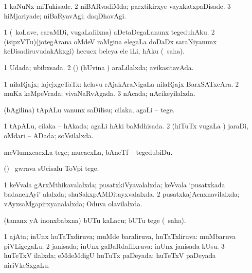 \bentry
{} 
\gl{\kirxvi}
\expl{}
\bmng
\bnum
\num{1} kaNuNx miTukisade. 
\num{2} niBARvadiMda; parxtikirxye vayxkatxpaDisade. 
\num{3} hiMjariyade; niBaRyavAgi; daqDhavAgi. 
\enum
\emng
\eentry

\bentry
{} 
\gl{\sakirx}
\expl{}
\bmng
\bnum
\num{1} (\kanmu\ koLave, caraMDi, \mo vugaLalilxna) aDetaDegaLanunx tegeduhAku. 
\num{2} (isipxVTu)(jotegArana oMdeV raMgina elegaLa doDaDx saraNiyanunx keDisadiruvudakAkxgi) hecucx beleya ele iLi, hAku (\akirx\ saha). 
\enum
\emng
\eentry

\bentry
{} 
\gl{\gu}
\expl{}
\bmng
\bnum
\num{1} Udada; ubibxsada. 
\num{2} (\pArxparx) (hUvina \vi) araLilalxda; avikasitavAda. 
\enum
\emng
\eentry

\bentry
{} 
\gl{\gu}
\expl{}
\bmng
\bnum
\num{1} nilaRjajx; lajejxgeTaTx:  kelavu rAjakAraNigaLa nilaRjajx BarxSATxcAra. 
\num{2} muKa keMpeVrada; vivaNaRvAgada. 
\num{3} nAcada; nAcikeyilalxda. 
\enum
\emng
\eentry

\bentry
{} 
\gl{\sakirx}
\expl{}
\bmng
(bAgilina) tApALu \mo vanunx saDilisu; cilaka, agaLi -- tege. 
\emng
\eentry

\bentry
{} 
\gl{\gu}
\expl{}
\bmng
\bnum
\num{1} tApALu, cilaka -- hAkada; agaLi hAki baMdhisada. 
\num{2} (hiTuTx \mo vugaLa \vi) jaraDi, oMdari -- ADada; soVsilalxda. 
\enum
\emng
\eentry

\bentry
{} 
\gl{\sakirx}
\expl{}
\bmng
meVlumxcacxLa tege; mucacxLa, bAneTf -- tegedubiDu. 
\emng

\noindent 
\gl{\akirx}
\expl{}
\bmng
(\pArxparx) \kanmu\ gwrava sUcisalu ToVpi tege. 
\emng
\eentry
 
\bentry
{} 
\gl{\gu}
\expl{}
\bmng
\bnum
\num{1} keVvala gArxMthikavalalxda; pusatxkiVyavalalxda; keVvala `pusatxkada badanekAyi' alalxda; shuSakxpAMDitayxvalalxda. 
\num{2} pusatxkajAcnxnavilalxda; vAyxsaMgapirxyanalalxda; Oduva olavilalxda. 
\enum
\emng
\eentry

\bentry
{} 
\gl{\akirx}
\expl{}
\bmng
(tananx yA inonxbabxna) bUTu kaLacu; bUTu tege (\akirx\ saha). 
\emng
\eentry

\bentry
{} 
\gl{\gu}
\expl{}
\bmng
\bnum
\num{1} ajAta; inUnx huTaTxdiruva; muMde baraliruva, huTaTxliruva:  muMbaruva piVLigegaLu. 
\num{2} janisada; inUnx gaBaRdalilxruva:  inUnx janisada kUsu. 
\num{3} huTeTxV ilalxda; eMdeMdigU huTuTx paDeyada:  huTeTxV paDeyada niriVkeSxgaLu. 
\enum
\emng
\eentry

